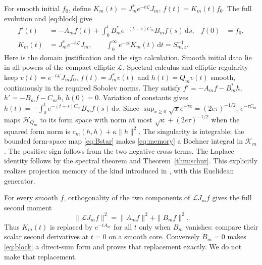 \documentclass[11pt]{article}
\newcommand{\dd}{\,\mathrm d}
\newcommand{\HH}{\mathscr H}
\newcommand{\KK}{\mathscr K}
\newcommand{\LL}{\mathscr L}
\begin{document}
For smooth initial $f_0$, define
$K_m(t)=J_m^*e^{-t\LL}J_m$, $f(t)=K_m(t)f_0$.
The full evolution and \eqref{eq:block} give
\begin{align}
 f'(t)&=-A_m f(t)+\int_0^t B_m^*e^{-(t-s)C_m}B_m f(s)\dd s,
       &f(0)&=f_0,\label{eq:memory}\\
 K_m(t)&=J_m^*e^{-t\LL}J_m,\qquad
 \int_0^\infty e^{-zt}K_m(t)\dd t=S_{m,z}^{-1}.\label{eq:laplace}
\end{align}
Here is the domain justification and the sign calculation. Smooth initial
data lie in all powers of the compact elliptic $\LL$. Spectral calculus
and elliptic regularity keep $v(t)=e^{-t\LL}J_mf_0$, $f(t)=J_m^*v(t)$
and $h(t)=Q_mv(t)$ smooth, continuously in the required Sobolev norms.
They satisfy $f'=-A_mf-B_m^*h$, $h'=-B_mf-C_mh$, $h(0)=0$.
Variation of constants gives
$h(t)=-\int_0^te^{-(t-s)C_m}B_mf(s)\dd s$.
Since $\sup_{x\geq0}\sqrt{x}e^{-\tau x}=(2e\tau)^{-1/2}$,
$e^{-\tau C_m}$ maps $\HH_{Q_m}$ to its form space with norm at most
$\sqrt\kappa+(2e\tau)^{-1/2}$ when the squared form norm is
$c_m(h,h)+\kappa\|h\|^2$. The singularity is integrable; the bounded form-space
map \eqref{eq:Bstar} makes \eqref{eq:memory} a Bochner integral in
$\KK_m$. The positive sign follows from the two negative cross terms.
The Laplace identity follows by the spectral theorem and
Theorem~\ref{thm:schur}. This explicitly realizes projection memory of
the kind introduced in \cite{Mori}, with this Euclidean generator.

For every smooth $f$, orthogonality of the two components of
$\LL J_mf$ gives the full second moment
\begin{equation}\label{eq:second}
 \|\LL J_mf\|^2=\|A_mf\|^2+\|B_mf\|^2.
\end{equation}
Thus $K_m(t)$ is replaced by $e^{-tA_m}$ for all $t$ only when $B_m$
vanishes: compare their scalar second derivatives at $t=0$ on a smooth
core. Conversely $B_m=0$ makes \eqref{eq:block} a direct-sum form and
proves that replacement exactly. We do not make that replacement.
\end{document}
